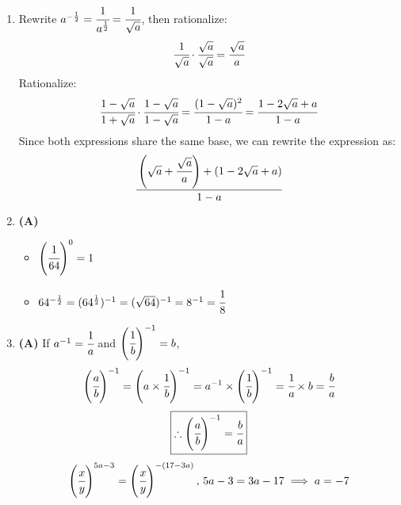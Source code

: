 \begin{multicols}{2}
\begin{enumerate}[label={\arabic*.}]
    \item Rewrite \( a^{-\frac{1}{2}} = \cfrac{1}{a^{\frac{1}{2}}} = \cfrac{1}{\sqrt{a}} \), then rationalize:
    \[\cfrac{1}{\sqrt{a}} \cdot \cfrac{\sqrt{a}}{\sqrt{a}} = \cfrac{\sqrt{a}}{a}\]
    Rationalize:
    \[\cfrac{1 - \sqrt{a}}{1 + \sqrt{a}} \cdot \cfrac{1 - \sqrt{a}}{1 - \sqrt{a}} = \cfrac{(1 - \sqrt{a})^2}{1 - a} = \cfrac{1 - 2\sqrt{a} + a}{1 - a}\]
    Since both expressions share the same base, we can rewrite the expression as:
    \[\cfrac{\left(\sqrt{a} + \cfrac{\sqrt{a}}{a}\right) + (1 - 2\sqrt{a} + a)}{1 - a}\]    

    \item \textbf{(A)}
    \begin{itemize} 
    \item $\left(\cfrac{1}{64}\right)^0 = 1$\\
    \item $64^{-\frac{1}{2}} = (64^{\frac{1}{2}})^{-1} = (\sqrt{64})^{-1}= 8^{-1} = \cfrac{1}{8}$ \\
    \end{itemize}

\item \textbf{(A)} If \( a^{-1} = \cfrac{1}{a} \) and \( \left(\cfrac{1}{b}\right)^{-1} = b \),
    \[\left(\cfrac{a}{b}\right)^{-1} = \left(a \times \cfrac{1}{b}\right)^{-1} = a^{-1} \times \left(\cfrac{1}{b}\right)^{-1} = \cfrac{1}{a} \times b = \cfrac{b}{a}\]
    \[\boxed{\therefore \left(\cfrac{a}{b}\right)^{-1} = \cfrac{b}{a}}\]
    \[\left(\cfrac{x}{y}\right)^{5a - 3} = \left(\cfrac{x}{y}\right)^{-(17 - 3a)}, \, 5a - 3 = 3a - 17 \implies a = -7\]


\end{enumerate}
\end{multicols}
